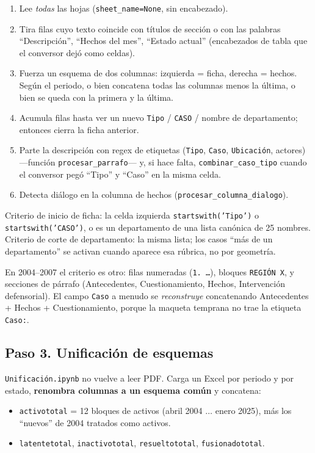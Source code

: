 \documentclass[11pt,a4paper]{article}
\begin{document}
\begin{enumerate}
  \item Lee \emph{todas} las hojas (\texttt{sheet\_name=None}, sin encabezado).
  \item Tira filas cuyo texto coincide con títulos de sección o con las palabras ``Descripción'', ``Hechos del mes'', ``Estado actual'' (encabezados de tabla que el conversor dejó como celdas).
  \item Fuerza un esquema de dos columnas: izquierda = ficha, derecha = hechos. Según el periodo, o bien concatena todas las columnas menos la última, o bien se queda con la primera y la última.
  \item Acumula filas hasta ver un nuevo \texttt{Tipo} / \texttt{CASO} / nombre de departamento; entonces cierra la ficha anterior.
  \item Parte la descripción con regex de etiquetas (\texttt{Tipo}, \texttt{Caso}, \texttt{Ubicación}, actores) ---función \texttt{procesar\_parrafo}--- y, si hace falta, \texttt{combinar\_caso\_tipo} cuando el conversor pegó ``Tipo'' y ``Caso'' en la misma celda.
  \item Detecta diálogo en la columna de hechos (\texttt{procesar\_columna\_dialogo}).
\end{enumerate}

Criterio de inicio de ficha: la celda izquierda \texttt{startswith('Tipo')} o \texttt{startswith('CASO')}, o es un departamento de una lista canónica de 25 nombres. Criterio de corte de departamento: la misma lista; los casos ``más de un departamento'' se activan cuando aparece esa rúbrica, no por geometría.

En 2004--2007 el criterio es otro: filas numeradas (\texttt{1.\ \ldots}), bloques \texttt{REGIÓN X}, y secciones de párrafo (Antecedentes, Cuestionamiento, Hechos, Intervención defensorial). El campo \texttt{Caso} a menudo se \emph{reconstruye} concatenando Antecedentes + Hechos + Cuestionamiento, porque la maqueta temprana no trae la etiqueta \texttt{Caso:}.

\subsection{Paso 3. Unificación de esquemas}

\texttt{Unificación.ipynb} no vuelve a leer PDF. Carga un Excel por periodo y por estado, \textbf{renombra columnas a un esquema común} y concatena:

\begin{itemize}
  \item \texttt{activototal} = 12 bloques de activos (abril 2004 $\ldots$ enero 2025), más los ``nuevos'' de 2004 tratados como activos.
  \item \texttt{latentetotal}, \texttt{inactivototal}, \texttt{resueltototal}, \texttt{fusionadototal}.
\end{itemize}
\end{document}
